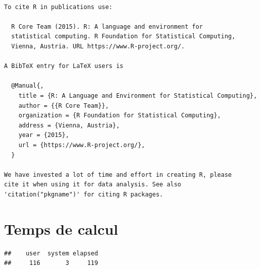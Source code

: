 \documentclass[]{article}
\begin{document}
\begin{verbatim}

To cite R in publications use:

  R Core Team (2015). R: A language and environment for
  statistical computing. R Foundation for Statistical Computing,
  Vienna, Austria. URL https://www.R-project.org/.

A BibTeX entry for LaTeX users is

  @Manual{,
    title = {R: A Language and Environment for Statistical Computing},
    author = {{R Core Team}},
    organization = {R Foundation for Statistical Computing},
    address = {Vienna, Austria},
    year = {2015},
    url = {https://www.R-project.org/},
  }

We have invested a lot of time and effort in creating R, please
cite it when using it for data analysis. See also
'citation("pkgname")' for citing R packages.
\end{verbatim}

\section{Temps de calcul}\label{temps-de-calcul}

\begin{verbatim}
##    user  system elapsed 
##     116       3     119
\end{verbatim}
\end{document}
